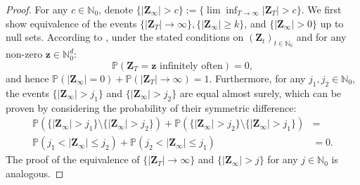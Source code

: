 \documentclass[preprint,3p,12pt]{elsarticle}
\theoremstyle{definition}
\begin{document}
\begin{proof}
For any $c \in \mathbb{N}_0$, denote $\{|\boldsymbol{Z}_{\infty}|>c\}:=\{\lim\inf_{T \rightarrow \infty}|\boldsymbol{Z}_{T}|>c\}$. We first show equivalence of the events $\{|\boldsymbol{Z}_T| \rightarrow \infty\}, \{|\boldsymbol{Z}_{\infty}| \ge k\}$, and $\{|\boldsymbol{Z}_{\infty}| > 0\}$ up to null sets. According to \cite[Chapter 2.6]{harris1963}, under the stated conditions on $(\boldsymbol{Z}_t)_{t\in\mathbb{N}_0}$ and for any non-zero $\boldsymbol{z} \in \mathbb{N}_0^{d}$:
\begin{equation*}
    \mathbb{P}(\boldsymbol{Z}_T = \boldsymbol{z} \text{ infinitely often}) = 0,
\end{equation*}
and hence $\mathbb{P}(|\boldsymbol{Z}_{\infty}| = 0)+\mathbb{P}(|\boldsymbol{Z}_T|\rightarrow \infty) = 1$. Furthermore, for any $j_1, j_2 \in \mathbb{N}_0$, the events $\{|\boldsymbol{Z}_{\infty}| > j_1\}$ and $\{|\boldsymbol{Z}_{\infty}| > j_2\}$ are equal almost surely, which can be proven by considering the probability of their symmetric difference:
\begin{align*}
    \mathbb{P}(\{|\boldsymbol{Z}_{\infty}| > j_1\} \setminus \{|\boldsymbol{Z}_{\infty}| > j_2\}) + \mathbb{P}(\{|\boldsymbol{Z}_{\infty}| > j_2\} \setminus \{|\boldsymbol{Z}_{\infty}| > j_1\}) &=\\ \mathbb{P}(j_1 <|\boldsymbol{Z}_{\infty}| \leq j_2) + \mathbb{P}(j_2 <|\boldsymbol{Z}_{\infty}| \leq j_1) &=0.
\end{align*}
The proof of the equivalence of $\{|\boldsymbol{Z}_T| \rightarrow \infty\}$ and $\{|\boldsymbol{Z}_{\infty}|> j\}$ for any $j \in \mathbb{N}_0$ is analogous.


\end{proof}
\end{document}

